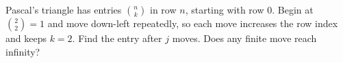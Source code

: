 Pascal's triangle has entries $\binom nk $ in row $ n $, starting with row $ 0 $. Begin at $\binom22=1 $ and move down-left repeatedly, so each move increases the row index and keeps $ k=2 $. Find the entry after $ j $ moves. Does any finite move reach infinity?
